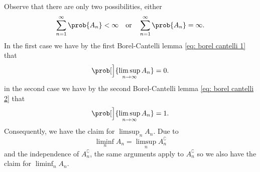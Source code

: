 \documentclass[11pt]{article}
\begin{document}
\begin{solution}
    Observe that there are only two possibilities, either
    \[
        \sum_{n=1}^\infty \prob{A_n} < \infty
            \quad\text{or}\quad
        \sum_{n=1}^\infty \prob{A_n} = \infty.
    \]
    In the first case we have by the first Borel-Cantelli lemma \eqref{eq: borel cantelli 1} that
    \[
        \prob[\Big]{\limsup_{n\to \infty} A_n} = 0.
    \]
    in the second case we have by the second Borel-Cantelli lemma \eqref{eq: borel cantelli 2} that
    \[
        \prob[\Big]{\limsup_{n\to \infty} A_n} = 1.
    \]
    Consequently, we have the claim for \(\limsup_n A_n\). Due to
    \[
        \liminf_n A_n = \limsup_n A_n^\complement
    \]
    and the independence of
    \(A_n^\complement\), the
    same arguments apply to \(A_n^\complement\) so we also have the claim for
    \(\liminf_n A_n\).
    \qedhere
\end{solution}
\end{document}
